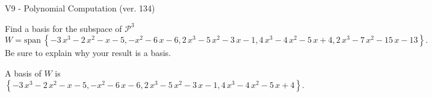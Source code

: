 \begin{exercise}
  \begin{exerciseTitle}V9 - Polynomial Computation (ver. 134)\end{exerciseTitle}
  \begin{exerciseStatement}
    Find a basis for the subspace of \(\mathcal{P}^3\) 
\[W=\mathrm{span}\ \left\{-3 \, x^{3} - 2 \, x^{2} - x - 5 , -x^{2} - 6 \, x - 6 , 2 \, x^{3} - 5 \, x^{2} - 3 \, x - 1 , 4 \, x^{3} - 4 \, x^{2} - 5 \, x + 4 , 2 \, x^{3} - 7 \, x^{2} - 15 \, x - 13\right\}.\]
 Be sure to explain why your result is a basis.


  \end{exerciseStatement}
  \begin{exerciseAnswer}
   A basis of \(W\) is  \(\left\{-3 \, x^{3} - 2 \, x^{2} - x - 5 , -x^{2} - 6 \, x - 6 , 2 \, x^{3} - 5 \, x^{2} - 3 \, x - 1 , 4 \, x^{3} - 4 \, x^{2} - 5 \, x + 4\right\}\).
  


  \end{exerciseAnswer}
\end{exercise}
